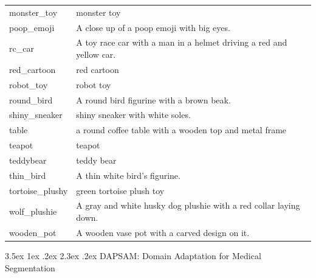 \documentclass[journal,12pt,onecolumn,draftclsnofoot]{IEEEtran}
\makeatletter
\renewcommand{\section}{\@startsection{section}{1}{\z@}%
    {3.5ex \@plus 1ex \@minus .2ex}%
    {2.3ex \@plus.2ex}%
    {\normalfont\Large\bfseries}}
\makeatother
\begin{document}
{\begin{longtable}{l p{10cm}}
monster\_toy & monster toy \\
poop\_emoji & A close up of a poop emoji with big eyes. \\
rc\_car & A toy race car with a man in a helmet driving a red and yellow car. \\
red\_cartoon & red cartoon \\
robot\_toy & robot toy \\
round\_bird & A round bird figurine with a brown beak. \\
shiny\_sneaker & shiny sneaker with white soles. \\
table & a round coffee table with a wooden top and metal frame \\
teapot & teapot \\
teddybear & teddy bear \\
thin\_bird & A thin white bird's figurine. \\
tortoise\_plushy & green tortoise plush toy \\
wolf\_plushie & A gray and white husky dog plushie with a red collar laying down. \\
wooden\_pot & A wooden vase pot with a carved design on it. \\
\end{longtable}
}

\newpage


\section{DAPSAM: Domain Adaptation for Medical Segmentation \cite{wei2024prompting}}
\end{document}
